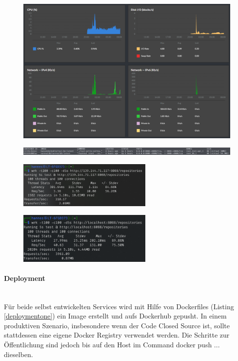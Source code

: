 \documentclass[notitlepage, hidelinks]{article}
\begin{document}
\begin{figure}[H]
\centering
  \includegraphics[width=\textwidth]{images/data2.png}
  \caption{}
  \label{fig:benchmarkone}
\end{figure}


\begin{figure}[H]
\centering
  \includegraphics[width=\textwidth]{images/data4.png}
  \caption{}
  \label{fig:benchmarktwo}
\end{figure}


\begin{figure}[H]
\centering
  \includegraphics[width=250px]{images/data.png}
  \caption{}
  \label{fig:benchmarkthree}
\end{figure}


\begin{figure}[H]
\centering
  \includegraphics[width=250px]{images/data5.png}
  \caption{}
  \label{fig:benchmarkfour}
\end{figure}


\paragraph{Deployment} \mbox{} \\
 Für beide selbst entwickelten Services wird mit Hilfe von Dockerfiles (Listing \ref{deploymentone}) ein Image erstellt und aufs Dockerhub gepusht. In einem produktiven Szenario, insbesondere wenn der Code Closed Source ist, sollte stattdessen eine eigene Docker Registry verwendet werden. Die Schritte zur Öffentlichung sind jedoch bis auf den Host im Command docker push ... dieselben. 
\end{document}
